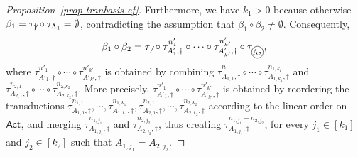 \begin{proof}[Proposition~\ref{prop-tranbasis-ef}]
	Furthermore, we have $k_1 > 0$ because otherwise $\beta_1 = \tau_{\not \dag} \circ \tau_{\Lambda_1} = \emptyset$, contradicting the assumption that $\beta_1 \circ \beta_2 \neq \emptyset$. 
	Consequently, 
	$$\beta_1 \circ \beta_2 = 
	\tau_{\not \dag} \circ \tau^{n'_{1}}_{A'_{1}, \dag} \circ \cdots \circ \tau^{n'_{k'}}_{A'_{k'}, \dag} \circ \tau_{\mathcircled{\Lambda_2}},$$
	where $\tau^{n'_{1}}_{A'_{1}, \dag} \circ \cdots \circ \tau^{n'_{k'}}_{A'_{k'}, \dag}$ is obtained by combining 
	$ \tau^{n_{1,1}}_{A_{1,1}, \dag} \circ \cdots \circ \tau^{n_{1, k_1}}_{A_{1, k_1}, \dag}$
	and 
	$ \tau^{n_{2,1}}_{A_{2,1}, \dag} \circ \cdots \circ \tau^{n_{2, k_2}}_{A_{2,k_2}, \dag}$. More precisely, $\tau^{n'_{1}}_{A'_{1}, \dag} \circ \cdots \circ \tau^{n'_{k'}}_{A'_{k'}, \dag}$ is obtained by reordering the transductions $ \tau^{n_{1,1}}_{A_{1,1}, \dag}, \cdots, \tau^{n_{1, k_1}}_{A_{1, k_1}, \dag},  \tau^{n_{2,1}}_{A_{2,1}, \dag}, \cdots, \tau^{n_{2, k_2}}_{A_{2,k_2}, \dag}$ according to the linear order on ${\sf Act}$,
	and merging $\tau^{n_{1,j_1}}_{A_{1, j_1}, \dag}$ and $\tau^{n_{2, j_2}}_{A_{2, j_2}, \dag}$, thus creating $\tau^{n_{1,j_1} + n_{2, j_2}}_{A_{1, j_1}, \dag}$, for every $j_1 \in [k_1]$ and $j_2 \in [k_2]$ such that $A_{1, j_1} = A_{2, j_2}$.  
	

\end{proof}
